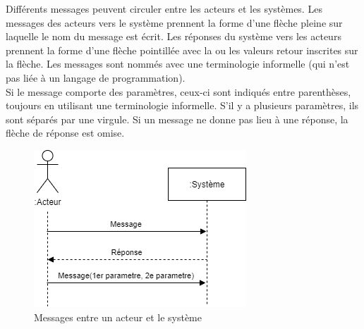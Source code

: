 Différents messages peuvent circuler entre les acteurs et les systèmes. Les messages des acteurs vers le système prennent la forme d'une flèche pleine sur laquelle le nom du message est écrit. Les réponses du système vers les acteurs prennent la forme d'une flèche pointillée avec la ou les valeurs retour inscrites sur la flèche. Les messages sont nommés avec une terminologie informelle (qui n'est pas liée à un langage de programmation).\\

Si le message comporte des paramètres, ceux-ci sont indiqués entre parenthèses, toujours en utilisant une terminologie informelle. S'il y a plusieurs paramètres, ils sont séparés par une virgule. Si un message ne donne pas lieu à une réponse, la flèche de réponse est omise.

\begin{figure}[H]
	\caption{Messages entre un acteur et le système}
	\centering
	\includegraphics[scale=0.6]{dss-messages.png}
\end{figure}

